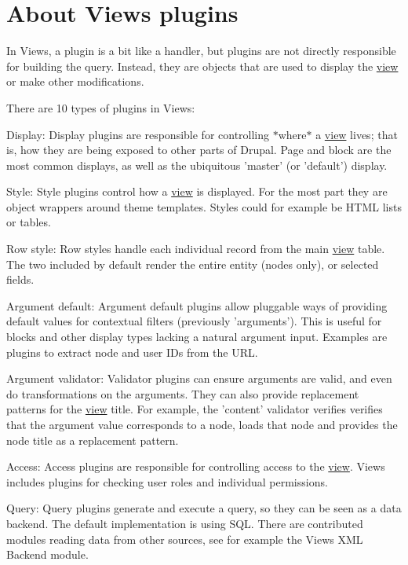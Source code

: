 \hypertarget{group__views__plugins}{
\section{About Views plugins}
\label{group__views__plugins}
}
In Views, a plugin is a bit like a handler, but plugins are not directly responsible for building the query. Instead, they are objects that are used to display the \hyperlink{classview}{view} or make other modifications.

There are 10 types of plugins in Views:
\begin{DoxyItemize}
\item Display: Display plugins are responsible for controlling $\ast$where$\ast$ a \hyperlink{classview}{view} lives; that is, how they are being exposed to other parts of Drupal. Page and block are the most common displays, as well as the ubiquitous 'master' (or 'default') display.
\item Style: Style plugins control how a \hyperlink{classview}{view} is displayed. For the most part they are object wrappers around theme templates. Styles could for example be HTML lists or tables.
\item Row style: Row styles handle each individual record from the main \hyperlink{classview}{view} table. The two included by default render the entire entity (nodes only), or selected fields.
\item Argument default: Argument default plugins allow pluggable ways of providing default values for contextual filters (previously 'arguments'). This is useful for blocks and other display types lacking a natural argument input. Examples are plugins to extract node and user IDs from the URL.
\item Argument validator: Validator plugins can ensure arguments are valid, and even do transformations on the arguments. They can also provide replacement patterns for the \hyperlink{classview}{view} title. For example, the 'content' validator verifies verifies that the argument value corresponds to a node, loads that node and provides the node title as a replacement pattern.
\item Access: Access plugins are responsible for controlling access to the \hyperlink{classview}{view}. Views includes plugins for checking user roles and individual permissions.
\item Query: Query plugins generate and execute a query, so they can be seen as a data backend. The default implementation is using SQL. There are contributed modules reading data from other sources, see for example the Views XML Backend module.

\end{DoxyItemize}
